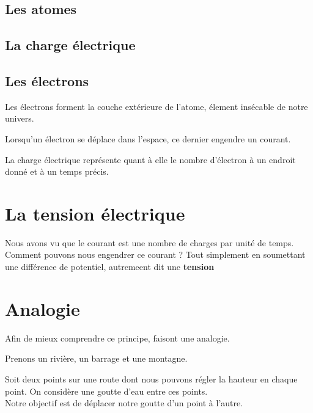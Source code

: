 \documentclass[12pt]{report}
\renewcommand{\bold}[1]{\textbf{#1}}
\begin{document}
\subsection{Les atomes}

\subsection{La charge électrique}


\subsection{Les électrons}

Les électrons forment la couche extérieure de l'atome, élement insécable de notre univers.


Lorsqu'un électron se déplace dans l'espace, ce dernier engendre un courant.



La charge électrique représente quant à elle le nombre d'électron à un endroit donné et à un temps précis.

\section{La tension électrique}

Nous avons vu que le courant est une nombre de charges par unité de temps. \\
Comment pouvons nous engendrer ce courant ? Tout simplement en soumettant une différence de potentiel, autremeent dit une \bold{tension}

\section{Analogie}
\newcommand{\A}{$A~$}
\newcommand{\B}{$B~$}

Afin de mieux comprendre ce principe, faisont une analogie.

Prenons un rivière, un barrage et une montagne.

Soit deux points sur une route dont nous pouvons régler la hauteur en chaque point. On considère une goutte d'eau entre ces points. \\
Notre objectif est de déplacer notre goutte d'un point à l'autre.
\end{document}
